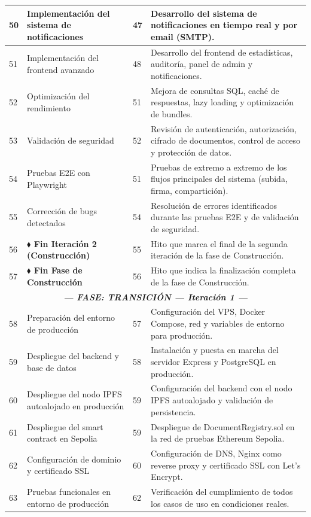 \documentclass[11pt, a4paper]{article}
\begin{document}
\begin{longtable}{|p{1cm}|p{5.5cm}|p{1.5cm}|p{5.5cm}|}
\hline
50 & Implementación del sistema de notificaciones & 47 & Desarrollo del sistema de notificaciones en tiempo real y por email (SMTP). \\
\hline
51 & Implementación del frontend avanzado & 48 & Desarrollo del frontend de estadísticas, auditoría, panel de admin y notificaciones. \\
\hline
52 & Optimización del rendimiento & 51 & Mejora de consultas SQL, caché de respuestas, lazy loading y optimización de bundles. \\
\hline
53 & Validación de seguridad & 52 & Revisión de autenticación, autorización, cifrado de documentos, control de acceso y protección de datos. \\
\hline
54 & Pruebas E2E con Playwright & 51 & Pruebas de extremo a extremo de los flujos principales del sistema (subida, firma, compartición). \\
\hline
55 & Corrección de bugs detectados & 54 & Resolución de errores identificados durante las pruebas E2E y de validación de seguridad. \\
\hline
56 & \textbf{$\blacklozenge$ Fin Iteración 2 (Construcción)} & 55 & Hito que marca el final de la segunda iteración de la fase de Construcción. \\
\hline
57 & \textbf{$\blacklozenge$ Fin Fase de Construcción} & 56 & Hito que indica la finalización completa de la fase de Construcción. \\
\hline
\multicolumn{4}{|c|}{\textit{\textbf{--- FASE: TRANSICIÓN --- Iteración 1 ---}}} \\
\hline
58 & Preparación del entorno de producción & 57 & Configuración del VPS, Docker Compose, red y variables de entorno para producción. \\
\hline
59 & Despliegue del backend y base de datos & 58 & Instalación y puesta en marcha del servidor Express y PostgreSQL en producción. \\
\hline
60 & Despliegue del nodo IPFS autoalojado en producción & 59 & Configuración del backend con el nodo IPFS autoalojado y validación de persistencia. \\
\hline
61 & Despliegue del smart contract en Sepolia & 59 & Despliegue de DocumentRegistry.sol en la red de pruebas Ethereum Sepolia. \\
\hline
62 & Configuración de dominio y certificado SSL & 60 & Configuración de DNS, Nginx como reverse proxy y certificado SSL con Let's Encrypt. \\
\hline
63 & Pruebas funcionales en entorno de producción & 62 & Verificación del cumplimiento de todos los casos de uso en condiciones reales. \\

\end{longtable}
\end{document}
